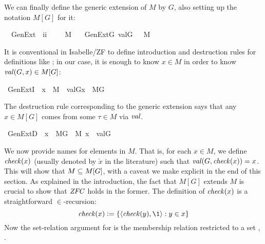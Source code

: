 We can finally define the generic extension of $M$ by $G$, also
setting up the notation $M[G]$ for it:
\begin{isabelle}
\isamarkupfalse%
\isanewline
\ \ GenExt\ {\isacharcolon}{\isacharcolon}\ {\isachardoublequoteopen}i{\isasymRightarrow}i{\isachardoublequoteclose}\ \ \ \ \ {\isacharparenleft}{\isachardoublequoteopen}M{\isacharbrackleft}{\isacharunderscore}{\isacharbrackright}{\isachardoublequoteclose}{\isacharparenright}\  \isanewline
\ \ {\isachardoublequoteopen}GenExt{\isacharparenleft}G{\isacharparenright}{\isacharequal}{\isacharequal}\ {\isacharbraceleft}val{\isacharparenleft}G{\isacharcomma}{\isasymtau}{\isacharparenright}{\isachardot}\ {\isasymtau}\ {\isasymin}\ M{\isacharbraceright}{\isachardoublequoteclose}
\end{isabelle}
It is conventional in Isabelle/ZF to define introduction and
destruction rules for definitions like ; in our case, it is
enough to know $x\in M$ in order to know $\operatorname{\mathit{val}}(G,x) \in M[G]$:
\begin{isabelle}
\isamarkupfalse%
\ GenExtI{\isacharcolon}\ \ {\isachardoublequoteopen}x\ {\isasymin}\ M\ {\isasymLongrightarrow}\ val{\isacharparenleft}G{\isacharcomma}x{\isacharparenright}\ {\isasymin}\ M{\isacharbrackleft}G{\isacharbrackright}{\isachardoublequoteclose}
\end{isabelle}
\noindent The destruction rule corresponding to the generic extension says
that any $x \in M[G]$ comes from some $\tau \in M$ via $\operatorname{\mathit{val}}$. 
\begin{isabelle}
\isamarkupfalse%
\ GenExtD{\isacharcolon}\ \ {\isachardoublequoteopen}x\ {\isasymin}\ M{\isacharbrackleft}G{\isacharbrackright}\ {\isasymLongrightarrow}\ {\isasymexists}{\isasymtau}{\isasymin}M{\isachardot}\ x\ {\isacharequal}\ val{\isacharparenleft}G{\isacharcomma}{\isasymtau}{\isacharparenright}{\isachardoublequoteclose}
\end{isabelle}


We now provide names for elements in $M$. That is, for each $x\in M$,
we define $\operatorname{\mathit{check}}(x)$ (usually denoted by $\check{x}$ in the literature)
such that $\operatorname{\mathit{val}}(G,\operatorname{\mathit{check}}(x))=x$. This will show that $M\subseteq M[G]$, with
a caveat we make explicit in the end of this section. As explained in
the introduction, the fact that $M[G]$ extends $M$ is crucial to show
that $\mathit{ZFC}$ holds in the former.
%
The definition of $\operatorname{\mathit{check}}(x)$ is a straightforward $\in$-recursion:
\begin{equation}
  \label{eq:def-check}
  \chk(x)\defi\{\lb\chk(y),\1\rb : y\in x\}
\end{equation}
Now the set-relation argument for  is the membership
relation restricted to a set , .


